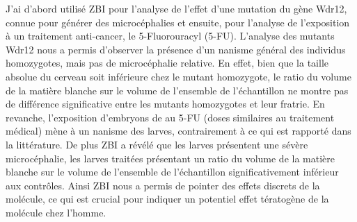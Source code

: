\documentclass[\main/main.tex]{subfiles}
\begin{document}
%
J'ai d'abord utilisé ZBI pour l'analyse de l'effet d'une mutation du gène Wdr12,
connue pour générer des microcéphalies et ensuite, pour l'analyse de l'exposition à un traitement anti-cancer,
le 5-Fluorouracyl (5-FU).
%
L'analyse des mutants Wdr12 nous a permis d'observer la présence
d'un nanisme général des individus homozygotes, mais pas de microcéphalie relative.
%
En effet, bien que la taille absolue du cerveau soit inférieure chez le mutant homozygote, 
le ratio du volume de la matière blanche sur le volume de l'ensemble de l'échantillon ne montre pas de différence significative entre les mutants homozygotes et leur fratrie.
%
En revanche, l'exposition d'embryons de \pz{} au 5-FU (doses similaires au traitement médical) mène à un nanisme des larves,
contrairement à ce qui est rapporté dans la littérature.
%
De plus ZBI a révélé que les larves présentent une sévère microcéphalie, les larves traitées présentant un ratio du volume de la matière blanche sur le volume de l'ensemble de l'échantillon significativement inférieur aux contrôles. Ainsi ZBI nous a permis de pointer des effets discrets de la molécule, ce qui est crucial pour indiquer un potentiel effet tératogène de la molécule chez l'homme.
\end{document}
